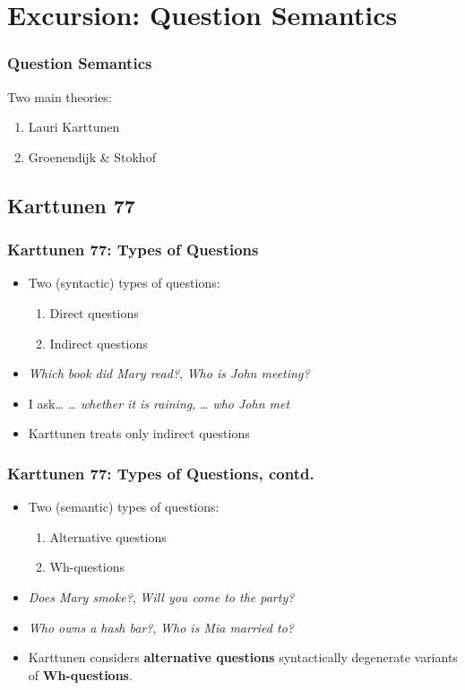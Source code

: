 \documentclass{beamer}
\newcommand{\stress}{\textbf}
\begin{document}
\section{Excursion: Question Semantics}
\begin{frame}
\frametitle{Question Semantics}
  Two main theories:
  \begin{enumerate}
    \item<1-| alert@3> Lauri Karttunen
    \item<2-> Groenendijk \& Stokhof
  \end{enumerate}
\end{frame}

\subsection{Karttunen 77}
\begin{frame}
  \frametitle{Karttunen 77: Types of Questions}
  \begin{itemize}
    \item<1-> Two (syntactic) types of questions:
      \begin{enumerate}
	\item<2-|alert@4> Direct questions
	\item<3-|alert@5> Indirect questions
      \end{enumerate}
    \item<4-> \emph{Which book did Mary read?}, \emph{Who is John meeting?}
    \item<5-> I ask\ldots{} \emph{\dots{} whether it is raining},
      \emph{\dots{} who John met}
    \item<6-> Karttunen treats only \alert{indirect questions}
  \end{itemize}
\end{frame}

\begin{frame}
  \frametitle{Karttunen 77: Types of Questions, contd.}
  \begin{itemize}
    \item<1-> Two (semantic) types of questions:
      \begin{enumerate}
	\item<2-|alert@4> Alternative questions \only<5->{\stress<5>{Yes/No questions}}
	\item<3-|alert@6> Wh-questions
      \end{enumerate}
    \item<4-> \emph{Does Mary smoke?}, \emph{Will you come to the party?}
    \item<6-> \emph{Who owns a hash bar?}, \emph{Who is Mia married to?}
    \item<7-> Karttunen considers \stress{alternative questions} syntactically
      degenerate variants of \stress{Wh-questions}.
  \end{itemize}
\end{frame}
\end{document}
